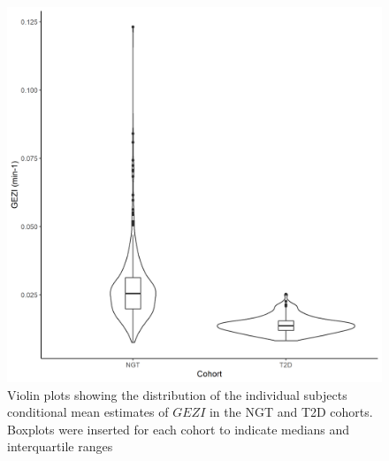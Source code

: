 \documentclass[utf8]{frontiersSCNS} %
\begin{document}
\begin{figure}[h!]
\begin{center}
\includegraphics[width=15cm]{SG_co.PNG}
\end{center}
\caption{Violin plots showing the distribution of the individual subjects conditional mean estimates of $GEZI$ in the NGT and T2D cohorts. Boxplots were inserted for each cohort to indicate medians and interquartile ranges}
\label{fig: SG_co}
\end{figure}
\end{document}
